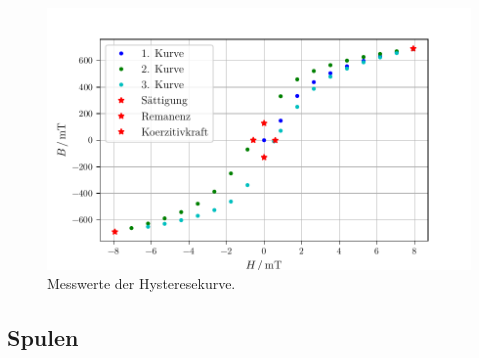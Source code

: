 \begin{figure}
    \centering
    \includegraphics[width=\textwidth]{Plots/plot_Hysterese.pdf}
    \caption{Messwerte der Hysteresekurve.}
    \label{fig:hyst}
\end{figure}
\pagebreak

\subsection{Spulen}
